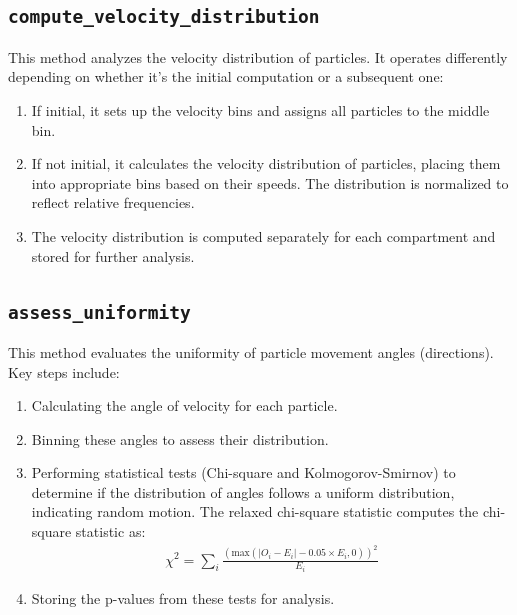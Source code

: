 \documentclass[10pt]{article}
\begin{document}
\subsection*{\texttt{compute\_velocity\_distribution}}
This method analyzes the velocity distribution of particles. It operates differently depending on whether it's the initial computation or a subsequent one:
\begin{enumerate}
    \itemsep-0.2em
    \item If initial, it sets up the velocity bins and assigns all particles to the middle bin.
    \item If not initial, it calculates the velocity distribution of particles, placing them into appropriate bins based on their speeds. The distribution is normalized to reflect relative frequencies.
    \item The velocity distribution is computed separately for each compartment and stored for further analysis.
\end{enumerate}

\subsection*{\texttt{assess\_uniformity}}
This method evaluates the uniformity of particle movement angles (directions). Key steps include:
\begin{enumerate}
    \itemsep-0.2em
    \item Calculating the angle of velocity for each particle.
    \item Binning these angles to assess their distribution.
    \item Performing statistical tests (Chi-square and Kolmogorov-Smirnov) to determine if the distribution of angles follows a uniform distribution, indicating random motion. The relaxed chi-square statistic computes the chi-square statistic as:
    \begin{align}
        \chi^2 = \sum_i \frac{ (\text{max} \left( \vert O_i - E_i\vert - 0.05\times E_i, 0  \right))^2}{E_i}
    \end{align}
    \item Storing the p-values from these tests for analysis.
\end{enumerate}
\end{document}
